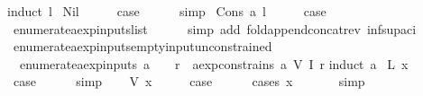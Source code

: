 \begin{isabellebody}
%
\isadelimproof
%
\endisadelimproof
%
\isatagproof
{}\isamarkupfalse%
{\isacharparenleft}induct\ l{\isacharparenright}\isanewline
{}\isamarkupfalse%
\ Nil\isanewline
\ \ \isamarkupfalse%
\ \isamarkupfalse%
\ {\isacharquery}case\isanewline
\ \ \ \ \isamarkupfalse%
\ simp\isanewline
{}\isamarkupfalse%
\isanewline
{}\isamarkupfalse%
\ {\isacharparenleft}Cons\ a\ l{\isacharparenright}\isanewline
\ \ \isamarkupfalse%
\ \isamarkupfalse%
\ {\isacharquery}case\isanewline
\ \ \ \ \isamarkupfalse%
\ enumerate{\isacharunderscore}aexp{\isacharunderscore}inputs{\isacharunderscore}list\isanewline
\ \ \ \ \isamarkupfalse%
\ {\isacharparenleft}simp\ add{\isacharcolon}\ fold{\isacharunderscore}append{\isacharunderscore}concat{\isacharunderscore}rev\ inf{\isacharunderscore}sup{\isacharunderscore}aci{\isacharparenleft}{}{\isacharparenright}{\isacharparenright}\isanewline
{}\isamarkupfalse%
%
\endisatagproof
{\isafoldproof}%
%
\isadelimproof
\isanewline
%
\endisadelimproof
\isanewline
{}\isamarkupfalse%
\ enumerate{\isacharunderscore}aexp{\isacharunderscore}inputs{\isacharunderscore}empty{\isacharunderscore}input{\isacharunderscore}unconstrained{\isacharcolon}\isanewline
\ \ {\isachardoublequoteopen}enumerate{\isacharunderscore}aexp{\isacharunderscore}inputs\ a\ {\isacharequal}\ {\isacharbraceleft}{\isacharbraceright}\ {\isasymLongrightarrow}\ {\isasymforall}r{\isachardot}\ {\isasymnot}\ aexp{\isacharunderscore}constrains\ a\ {\isacharparenleft}V\ {\isacharparenleft}I\ r{\isacharparenright}{\isacharparenright}{\isachardoublequoteclose}\isanewline
%
\isadelimproof
%
\endisadelimproof
%
\isatagproof
{}\isamarkupfalse%
{\isacharparenleft}induct\ a{\isacharparenright}\isanewline
{}\isamarkupfalse%
\ {\isacharparenleft}L\ x{\isacharparenright}\isanewline
\ \ \isamarkupfalse%
\ \isamarkupfalse%
\ {\isacharquery}case\isanewline
\ \ \ \ \isamarkupfalse%
\ simp\isanewline
{}\isamarkupfalse%
\isanewline
\ \ \isamarkupfalse%
\ {\isacharparenleft}V\ x{\isacharparenright}\isanewline
\ \ \isamarkupfalse%
\ \isamarkupfalse%
\ {\isacharquery}case\isanewline
\ \ \ \ \isamarkupfalse%
\ {\isacharparenleft}cases\ x{\isacharparenright}\isanewline
\ \ \ \ \ \isamarkupfalse%
\ simp\isanewline
\ \ \ \ \isamarkupfalse%

\end{isabellebody}
